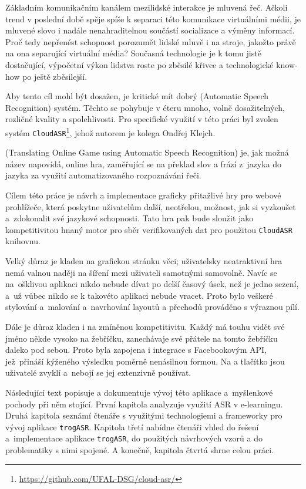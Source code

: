 
Základním komunikačním kanálem mezilidské interakce je mluvená řeč. Ačkoli trend v poslední době spěje spíše k separaci této komunikace virtuálními médii, je mluvené slovo i nadále nenahraditelnou součástí socializace a výměny informací. Proč tedy nepřenést schopnost porozumět lidské mluvě i na stroje, jakožto právě na ona separující virtuální média? Současná technologie je k tomu jistě dostačující, výpočetní výkon lidstva roste po zběsilé křivce a technologické know-how po ještě zběsilejší.

Aby tento cíl mohl být dosažen, je kritické mít dobrý  (Automatic Speech Recognition) systém. Těchto se pohybuje v éteru mnoho, volně dosažitelných, rozličné kvality a spolehlivosti. Pro specifické využití v této práci byl zvolen systém 
\verb|CloudASR|\footnote{\url{https://github.com/UFAL-DSG/cloud-asr/}}, jehož autorem je kolega Ondřej Klejch.

\texttt{} (Translating Online Game using Automatic Speech Recognition) je, jak možná název napovídá, online hra, zaměřující se na překlad slov a frází z~jazyka do jazyka za využití automatizovaného rozpoznávání řeči.

Cílem této práce je návrh a implementace graficky přitažlivé hry pro webové prohlížeče, která poskytne uživatelům další, neotřelou, možnost, jak si vyzkoušet a~zdokonalit své jazykové schopnosti. Tato hra pak bude sloužit jako kompetitivitou hnaný motor pro sběr verifikovaných dat pro použitou \verb|CloudASR| knihovnu.

Velký důraz je kladen na grafickou stránku věci; uživatelsky neatraktivní hra nemá valnou naději na šíření mezi uživateli samotnými samovolně. Navíc se na~ošklivou aplikaci nikdo nebude dívat po delší časový úsek, než je jedno sezení, a~už vůbec nikdo se k takovéto aplikaci nebude vracet. Proto bylo veškeré stylování a~malování a~navrhování layoutů a přechodů prováděno s výraznou pílí.

Dále je důraz kladen i na zmíněnou kompetitivitu. Každý má touhu vidět své jméno někde vysoko na žebříčku, zanechávaje své přátele na tomto žebříčku daleko pod sebou. Proto byla zapojena i integrace s Facebookovým API, jež~přináší kýženého výsledku poměrně nenásilnou formou. Na  a  tlačítko jsou uživatelé zvyklí a~nebojí se jej extenzivně používat.

Následující text popisuje a dokumentuje vývoj této aplikace a~myšlenkové pochody při něm stojící. První kapitola analyzuje využití ASR v e-learningu. Druhá kapitola seznámí čtenáře s využitými technologiemi a frameworky pro vývoj aplikace \verb|trogASR|. Kapitola třetí nabídne čtenáři vhled do řešení a~implementace aplikace \verb|trogASR|, do použitých návrhových vzorů a do problematiky s nimi spojené. A konečně, kapitola čtvrtá shrne celou práci.
